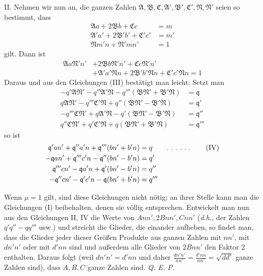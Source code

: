 II. Nehmen wir nun an, die ganzen Zahlen $\mathfrak{A},\mathfrak{B},\mathfrak{C},\mathfrak{A}',\mathfrak{B}',\mathfrak{C}',\mathfrak{N},\mathfrak{N}'$ seien so bestimmt, dass
\[
\begin{aligned}
\mathfrak{A}a+2\mathfrak{B}b+\mathfrak{C}c&=m\\
\mathfrak{A}'a'+2\mathfrak{B}'b'+\mathfrak{C}'c'&=m'\\
\mathfrak{N}m'n+\mathfrak{N}'mn'&=1
\end{aligned}
\]
gilt. Dann ist
\[
\begin{aligned}\mathfrak{A}a\mathfrak{N}'n'&+2\mathfrak{B}b\mathfrak{N}'n'+\mathfrak{C}c\mathfrak{N}'n'\\&+\mathfrak{A}'a'\mathfrak{N}n+2\mathfrak{B}'b'\mathfrak{N}n+\mathfrak{C}'c'\mathfrak{N}n=1\end{aligned}
\]
Daraus und aus den Gleichungen (III) bestätigt man leicht: Setzt man
\[
\begin{aligned}
-q'\mathfrak{A}\mathfrak{N}'-q''\mathfrak{A}'\mathfrak{N}-q'''(\mathfrak{B}\mathfrak{N}'+\mathfrak{B}'\mathfrak{N})&=\mathfrak{q}\\
q\mathfrak{A}\mathfrak{N}'-q'''\mathfrak{C}'\mathfrak{N}+q''(\mathfrak{B}\mathfrak{N}'-\mathfrak{B}'\mathfrak{N})&=\mathfrak{q}'\\
-q'''\mathfrak{C}\mathfrak{N}'+q\mathfrak{A}'\mathfrak{N}-q'(\mathfrak{B}\mathfrak{N}'-\mathfrak{B}'\mathfrak{N})&=\mathfrak{q}''\\
q''\mathfrak{C}\mathfrak{N}'+q'\mathfrak{C}'\mathfrak{N}+q(\mathfrak{B}\mathfrak{N}'+\mathfrak{B}'\mathfrak{N})&=\mathfrak{q}'''
\end{aligned}
\]
so ist
\[
\begin{aligned}
\mathfrak{q}'an'+\mathfrak{q}''a'n+\mathfrak{q}'''(bn'+b'n)&=q\qquad\ldotp\,\ldotp\,\ldotp\,\ldotp\,\ldotp\,\ldotp\qquad\text{(IV)}\\
-\mathfrak{q}an'+\mathfrak{q}'''c'n-\mathfrak{q}''(bn'-b'n)&=q'\\
\mathfrak{q}'''cn'-\mathfrak{q}a'n+\mathfrak{q}'(bn'-b'n)&=q''\\
-\mathfrak{q}''cn'-\mathfrak{q}'c'n-\mathfrak{q}(bn'+b'n)&=q'''
\end{aligned}
\]

Wenn $\mu=1$ gilt, sind diese Gleichungen nicht nötig; an ihrer Stelle kann man die Gleichungen (I) beibehalten, denen sie völlig entsprechen. Entwickelt man nun aus den Gleichungen II, IV die Werte von $Ann',2Bnn',Cnn'$ (\textit{d.h.}, der Zahlen $q'q''-qq'''$ usw.) und streicht die Glieder, die einander aufheben, so findet man, dass die Glieder jeder dieser Größen
Produkte aus ganzen Zahlen mit $nn'$, mit $dn'n'$ oder mit $d'nn$ sind und außerdem alle Glieder von $2Bnn'$ den Faktor 2 enthalten. Daraus folgt (weil $dn'n'=d'nn$ und daher $\frac{dn'n'}{nn'}=\frac{d'nn}{nn'}=\sqrt{dd'}$ ganze Zahlen sind), dass $A,B,C$ ganze Zahlen sind. \textit{Q. E. P.}


